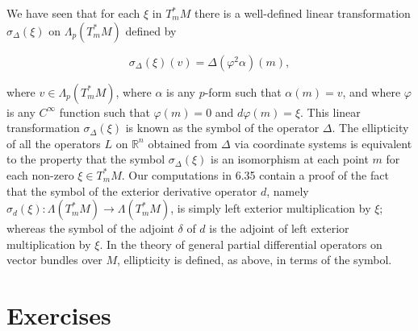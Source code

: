 \begin{remarks}\label{thm:6.36}
We have seen that for each $\xi$ in $T_{m}^{*} M$ there is a well-defined linear transformation $\sigma_\Delta(\xi)$ on $\Lambda_p(T_{m}^{*} M)$ defined by

\begin{equation}
\tag{1}\label{eq:6.36:1}
\sigma_{\Delta}(\xi)(v)=\Delta(\varphi^{2}\alpha)(m),
\end{equation}

where  $ v \in \Lambda_p(T_{m}^{*} M) $, where  $ \alpha $ is any  $ p $-form such that  $ \alpha(m) = v $, and where  $ \varphi $ is any  $ C^\infty $ function such that  $ \varphi(m) = 0 $ and  $ d\varphi(m) = \xi $. This linear transformation  $ \sigma_\Delta(\xi) $ is known as the symbol of the operator  $ \Delta $. The ellipticity of all the operators  $ L $ on  $ \mathbb{R}^n $ obtained from  $ \Delta $ via coordinate systems is equivalent to the property that the symbol  $ \sigma_\Delta(\xi) $ is an isomorphism at each point  $ m $ for each non-zero  $ \xi \in T_{m}^{*} M $. Our computations in 6.35 contain a proof of the fact that the symbol of the exterior derivative operator  $ d $, namely  $ \sigma_d(\xi): \Lambda(T_{m}^{*} M) \to \Lambda(T_{m}^{*} M) $, is simply left exterior multiplication by  $ \xi $; whereas the symbol of the adjoint  $ \delta $ of  $ d $ is the adjoint of left exterior multiplication by  $ \xi $. In the theory of general partial differential operators on vector bundles over  $ M $, ellipticity is defined, as above, in terms of the symbol. 

\end{remarks}

\section{Exercises}

